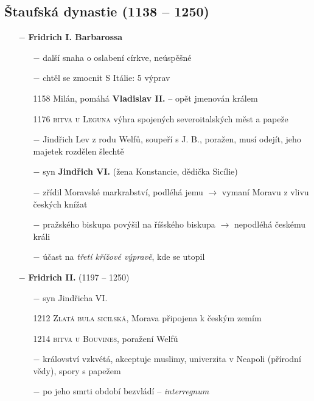 \documentclass{article}
\begin{document}
\subsection*{Štaufská dynastie (1138 -- 1250)}
\begin{itemize}
    \vspace{-0.5em}
    \setlength\itemsep{0.15em}
    \item[$-$] \textbf{Fridrich I. Barbarossa}
        \begin{itemize}
            \vspace{-0.5em}
            \setlength\itemsep{0.15em}
            \item[$-$] další snaha o oslabení církve, neúspěšné
            \item[$-$] chtěl se zmocnit S Itálie: 5 výprav
            \item[1158] Milán, pomáhá \textbf{Vladislav II.} -- opět jmenován králem
            \item[1176] \textsc{bitva u Leguna} výhra spojených severoitalských měst a papeže
            \item[$-$] Jindřich Lev z rodu Welfů, soupeří s J. B., poražen, musí odejít, jeho majetek rozdělen šlechtě
            \item[$-$] syn \textbf{Jindřich VI.} (žena Konstancie, dědička Sicílie)
            \item[$-$] zřídil Moravské markrabství, podléhá jemu $\rightarrow$ vymaní Moravu z vlivu českých knížat
            \item[$-$] pražského biskupa povýšil na říšského biskupa $\rightarrow$ nepodléhá českému králi
            \item[$-$] účast na \textit{třetí křížové výpravě}, kde se utopil
        \end{itemize}
    \item[$-$] \textbf{Fridrich II.} (1197 -- 1250)
        \begin{itemize}
            \vspace{-0.5em}
            \setlength\itemsep{0.15em}
            \item[$-$] syn Jindřicha VI.
            \item[1212] \textsc{Zlatá bula sicilská}, Morava připojena k českým zemím
            \item[1214] \textsc{bitva u Bouvines}, poražení Welfů
            \item[$-$] království vzkvétá, akceptuje muslimy, univerzita v Neapoli (přírodní vědy), spory s papežem
            \item[$-$] po jeho smrti období bezvládí -- \textit{interregnum}

\end{itemize}
\end{itemize}
\end{document}
